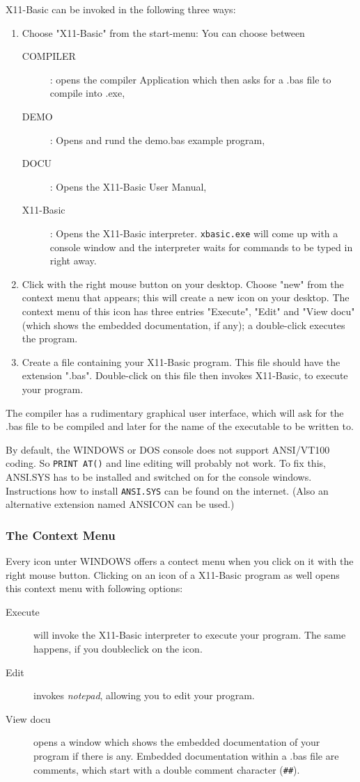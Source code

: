 X11-Basic can be invoked in the following three ways:

\begin{enumerate}
\item Choose "X11-Basic" from the start-menu: You can choose between 
\begin{description}
\item[COMPILER]: opens the compiler Application which then asks for a .bas file to compile into .exe,
\item[DEMO]: Opens and rund the demo.bas example program,
\item[DOCU]: Opens the X11-Basic User Manual,
\item[X11-Basic]: Opens the X11-Basic interpreter. \verb|xbasic.exe| will come 
up with a console window and the interpreter waits for commands to be typed
in right away.
\end{description}
\item Click with the right mouse button on your desktop. Choose "new" from the 
      context menu that appears; this will create a new icon on your desktop. 
      The context menu of this icon has three entries "Execute", "Edit" and   
      "View docu" (which shows the embedded documentation, if any); a         
      double-click executes the program.
\item Create a file containing your X11-Basic program. This file should have    
      the extension ".bas". Double-click on this file then invokes X11-Basic,   
      to execute your program. 
\end{enumerate}

The compiler has a rudimentary graphical user interface, which will ask for 
the .bas file to be compiled and later for the name of the executable to be 
written to.

By default, the WINDOWS or DOS console does not support ANSI/VT100 coding.  So
\verb|PRINT AT()| and line editing will probably not work. To fix this,
ANSI.SYS  has to be installed and switched on for the console windows.
Instructions how to install \verb|ANSI.SYS| can be found on the internet. 
(Also an alternative extension named ANSICON can be used.)

\subsubsection*{The Context Menu}

Every icon unter WINDOWS offers a contect menu when you click on it with the
right mouse button. Clicking on an icon of a X11-Basic program as well opens this 
context menu with following options: 
\begin{description}
\item[Execute] will invoke the X11-Basic interpreter to execute your program. 
The same happens, if you doubleclick on the icon.
\item[Edit] invokes {\it notepad}, allowing you to edit your program.
\item[View docu] opens a window which shows the embedded documentation 
of your program if there is any. Embedded documentation within a .bas file are comments, which
start with a double comment character (\verb|##|).
\end{description}

